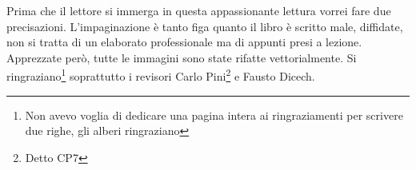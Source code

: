 %
%
%

\preface

Prima che il lettore si immerga in questa appassionante lettura vorrei fare due precisazioni. L'impaginazione è tanto figa quanto il libro è scritto male, diffidate, non si tratta di un elaborato professionale ma di appunti presi a lezione. Apprezzate però, tutte le immagini sono state rifatte vettorialmente. Si ringraziano\footnote{Non avevo voglia di dedicare una pagina intera ai ringraziamenti per scrivere due righe, gli alberi ringraziano} soprattutto i revisori Carlo Pini\footnote{Detto CP7} e Fausto Dicech.

